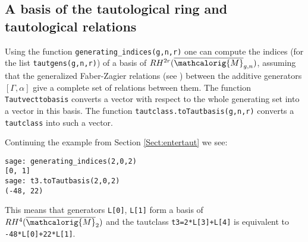 \documentclass[11pt]{article}
\newcommand{\todo}[1]{}
\newcommand{\M}{\ensuremath{\overline{\mathcalorig{M}}}}
\begin{document}
\subsection{A basis of the tautological ring and tautological relations} \label{Sect:basis}
Using the function \verb|generating_indices(g,n,r)| one can compute the indices (for the list \texttt{tautgens(g,n,r)}) of a basis of $RH^{2r}(\M_{g,n})$, assuming that the generalized Faber-Zagier relations (see \cite{pixtonrels,pandhapixton,jandarels}) between the additive generators $[\Gamma, \alpha]$ give a complete set of relations between them. The function \verb|Tautvecttobasis| converts a vector with respect to the whole generating set into a vector in this basis. The function \verb|tautclass.toTautbasis(g,n,r)| converts a \verb|tautclass| into such a vector. \todo{expand FZconjectureholds}

Continuing the example from Section \ref{Sect:entertaut} we see:
\begin{lstlisting}
sage: generating_indices(2,0,2)
[0, 1]
sage: t3.toTautbasis(2,0,2)
(-48, 22)
\end{lstlisting}
This means that generators \verb|L[0]|, \verb|L[1]|  form a basis of $RH^4(\M_2)$ and the tautclass \verb|t3=2*L[3]+L[4]| is equivalent to \verb|-48*L[0]+22*L[1]|.
\end{document}
